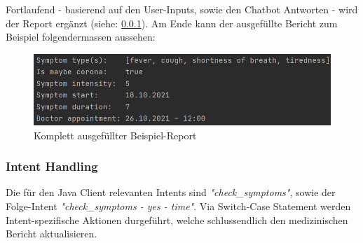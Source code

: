 \documentclass[11pt,a4paper]{article}
\begin{document}
	        Fortlaufend - basierend auf den User-Inputs, sowie den Chatbot Antworten - wird der Report ergänzt (siehe: \ref{sssec:intent_handling}). Am Ende kann der ausgefüllte Bericht zum Beispiel folgendermassen aussehen:
			\begin{figure}[h!]
				\begin{center}
            		\includegraphics[width=0.65\linewidth]{JavaClient-CompletedReport.png}
		            \caption{Komplett ausgefüllter Beispiel-Report}
		            \label{fig:javaClient_completedReport}
				\end{center}
	        \end{figure}
		
		\subsubsection{Intent Handling} \label{sssec:intent_handling}			
		Die für den Java Client relevanten Intents sind \emph{"check\_symptoms"}, sowie der Folge-Intent \emph{"check\_symptoms - yes - time"}. Via Switch-Case Statement werden Intent-spezifische Aktionen durgeführt, welche schlussendlich den medizinischen Bericht aktualisieren. \\\\
		
\end{document}

